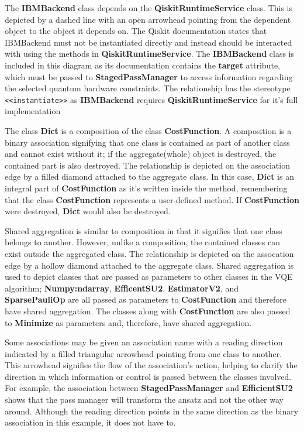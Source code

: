 \documentclass{article}
\begin{document}
{The \textbf{IBMBackend} class depends on the \textbf{QiskitRuntimeService} class. This is depicted by a dashed line with an open arrowhead pointing from the dependent object to the object it depends on. The Qiskit documentation states that IBMBackend must not be instantiated directly and instead should be interacted with using the methods in \textbf{QiskitRuntimeService}\cite{IBMBackend}. The \textbf{IBMBackend} class is included in this diagram as its documentation contains the \textbf{target} attribute, which must be passed to \textbf{StagedPassManager} to access information regarding the selected quantum hardware constraints. The relationship has the stereotype \texttt{<<instantiate>>} as \textbf{IBMBackend} requires \textbf{QiskitRuntimeService} for it's full implementation\cite{Dependencyrelationships}

The class \textbf{Dict} is a composition of the class \textbf{CostFunction}. A composition is a binary association signifying that one class is contained as part of another class and cannot exist without it; if the aggregate(whole) object is destroyed, the contained part is also destroyed\cite{UMLComposition}. The relationship is depicted on the association edge by a filled diamond attached to the aggregate class. In this case, \textbf{Dict} is an integral part of \textbf{CostFunction} as it's written inside the method, remembering that the class \textbf{CostFunction} represents a user-defined method. If \textbf{CostFunction} were destroyed, \textbf{Dict} would also be destroyed.

Shared aggregation is similar to composition in that it signifies that one class belongs to another\cite{Seidl_Scholz_Huemer_Kappel_Duffy_2014}. However, unlike a composition, the contained classes can exist outside the aggregated class. The relationship is depicted on the assocation edge by a hollow diamond attached to the aggregate class. Shared aggregation is used to depict classes that are passed as parameters to other classes in the VQE algorithm; \textbf{Numpy:ndarray}, \textbf{EfficentSU2}, \textbf{EstimatorV2}, and \textbf{SparsePauliOp} are all passed as parameters to \textbf{CostFunction} and therefore have shared aggregation. The classes along with \textbf{CostFunction} are also passed to \textbf{Minimize} as parameters and, therefore, have shared aggregation. 

Some associations may be given an association name with a reading direction indicated by a filled triangular arrowhead pointing from one class to another. This arrowhead signifies the flow of the association's action, helping to clarify the direction in which information or control is passed between the classes involved. For example, the association between \textbf{StagedPassManager} and \textbf{EfficientSU2} shows that the pass manager will transform the ansatz and not the other way around. Although the reading direction points in the same direction as the binary association in this example, it does not have to\cite{Seidl_Scholz_Huemer_Kappel_Duffy_2014}.

}
\end{document}
